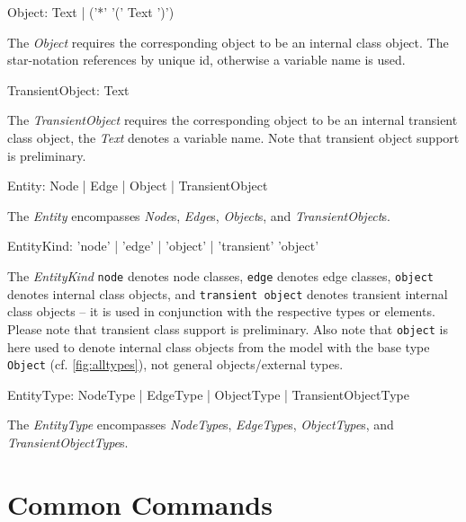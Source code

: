 \makeatletter
\begin{rail}
  Object: Text | ('*' '(' Text ')')
\end{rail}\indexmain{\texttt{*}}
\makeatother
The \emph{Object} requires the corresponding object to be an internal class object. The star-notation references by unique id, otherwise a variable name is used.

\makeatletter
\begin{rail}
  TransientObject: Text
\end{rail}
\makeatother
The \emph{TransientObject} requires the corresponding object to be an internal transient class object, the \emph{Text} denotes a variable name. Note that transient object support is preliminary.

\makeatletter
\begin{rail}
  Entity: Node | Edge | Object | TransientObject
\end{rail}
\makeatother
The \emph{Entity} encompasses \emph{Node}s, \emph{Edge}s, \emph{Object}s, and \emph{TransientObject}s.

\begin{rail}
  EntityKind: 'node' | 'edge' | 'object' | 'transient' 'object'
\end{rail}
The \emph{EntityKind} \texttt{node} denotes node classes, \texttt{edge} denotes edge classes, \texttt{object} denotes internal class objects, and \texttt{transient object} denotes transient internal class objects -- it is used in conjunction with the respective types or elements.
Please note that transient class support is preliminary.
Also note that \texttt{object} is here used to denote internal class objects from the model with the base type \texttt{Object} (cf. \ref{fig:alltypes}), not general objects/external types.

\begin{rail}
  EntityType: NodeType | EdgeType | ObjectType | TransientObjectType
\end{rail}
The \emph{EntityType} encompasses \emph{NodeType}s, \emph{EdgeType}s, \emph{ObjectType}s, and \emph{TransientObjectType}s.


\section{Common Commands}
\label{commcommands}

